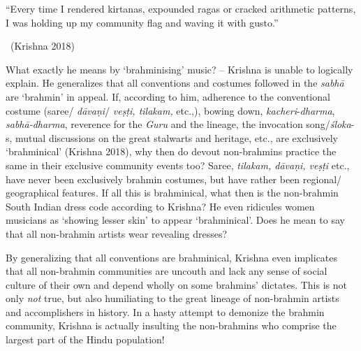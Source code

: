 \begin{myquote}
“Every time I rendered kirtanas, expounded ragas or cracked arithmetic patterns, I was holding up my community flag and waving it with gusto.” 

\vspace{-.1cm}

~\hfill (Krishna 2018)
\end{myquote}

\vspace{-.1cm}

What exactly he means by ‘brahminising’ music? – Krishna is unable to logically explain. He generalizes that all conventions and costumes followed in the \textit{sabhā} are ‘brahmin’ in appeal. If, according to him, adherence to the conventional costume (saree/ \textit{dāvaṇi}/ \textit{veṣṭi, tilakam,} etc.,), bowing down, \textit{kacheri}-\textit{dharma}, \textit{sabhā-dharma}, reverence for the \textit{Guru} and the lineage, the invocation song/\textit{śloka}-s, mutual discussions on the great stalwarts and heritage, etc., are exclusively ‘brahminical’ (Krishna 2018), why then do devout non-brahmins practice the same in their exclusive community events too? Saree, \textit{tilakam, dāvaṇi, veṣṭi} etc., have never been exclusively brahmin costumes, but have rather been regional/ geographical features. If all this is brahminical, what then is the non-brahmin South Indian dress code according to Krishna? He even ridicules women musicians as ‘showing lesser skin’ to appear ‘brahminical’. Does he mean to say that all non-brahmin artists wear revealing dresses?

By generalizing that all conventions are brahminical, Krishna even implicates that all non-brahmin communities are uncouth and lack any sense of social culture of their own and depend wholly on some brahmins’ dictates. This is not only \textit{not} true, but also humiliating to the great lineage of non-brahmin artists and accomplishers in history. In a hasty attempt to demonize the brahmin community, Krishna is actually insulting the non-brahmins who comprise the largest part of the Hindu population!

\newpage


